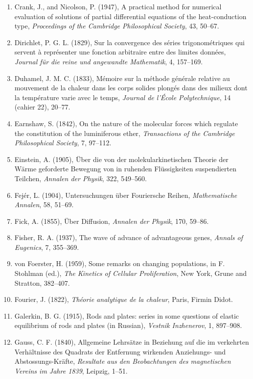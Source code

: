 \documentclass[11pt,a4paper]{article}
\numberwithin{equation}{section}
\theoremstyle{definition}
\begin{document}
\begin{enumerate}
\item Crank, J., and Nicolson, P. (1947), A practical method for numerical evaluation of solutions of partial differential equations of the heat-conduction type, \emph{Proceedings of the Cambridge Philosophical Society}, 43, 50--67.
\item Dirichlet, P. G. L. (1829), Sur la convergence des s\'eries trigonom\'etriques qui servent \`a repr\'esenter une fonction arbitraire entre des limites donn\'ees, \emph{Journal f\"ur die reine und angewandte Mathematik}, 4, 157--169.
\item Duhamel, J. M. C. (1833), M\'emoire sur la m\'ethode g\'en\'erale relative au mouvement de la chaleur dans les corps solides plong\'es dans des milieux dont la temp\'erature varie avec le temps, \emph{Journal de l'\'Ecole Polytechnique}, 14 (cahier 22), 20--77.
\item Earnshaw, S. (1842), On the nature of the molecular forces which regulate the constitution of the luminiferous ether, \emph{Transactions of the Cambridge Philosophical Society}, 7, 97--112.
\item Einstein, A. (1905), \"Uber die von der molekularkinetischen Theorie der W\"arme geforderte Bewegung von in ruhenden Fl\"ussigkeiten suspendierten Teilchen, \emph{Annalen der Physik}, 322, 549--560.
\item Fej\'er, L. (1904), Untersuchungen \"uber Fouriersche Reihen, \emph{Mathematische Annalen}, 58, 51--69.
\item Fick, A. (1855), \"Uber Diffusion, \emph{Annalen der Physik}, 170, 59--86.
\item Fisher, R. A. (1937), The wave of advance of advantageous genes, \emph{Annals of Eugenics}, 7, 355--369.
\item von Foerster, H. (1959), Some remarks on changing populations, in F. Stohlman (ed.), \emph{The Kinetics of Cellular Proliferation}, New York,
Grune and Stratton, 382--407.
\item Fourier, J. (1822), \emph{Th\'eorie analytique de la chaleur}, Paris, Firmin Didot.
\item Galerkin, B. G. (1915), Rods and plates: series in some questions of elastic equilibrium of rods and plates (in Russian), \emph{Vestnik Inzhenerov}, 1, 897--908.
\item Gauss, C. F. (1840), Allgemeine Lehrs\"atze in Beziehung auf die im verkehrten Verh\"altnisse des Quadrats der Entfernung wirkenden Anziehungs- und Abstossungs-Kr\"afte, \emph{Resultate aus den Beobachtungen des magnetischen Vereins im Jahre 1839}, Leipzig, 1--51.

\end{enumerate}
\end{document}
